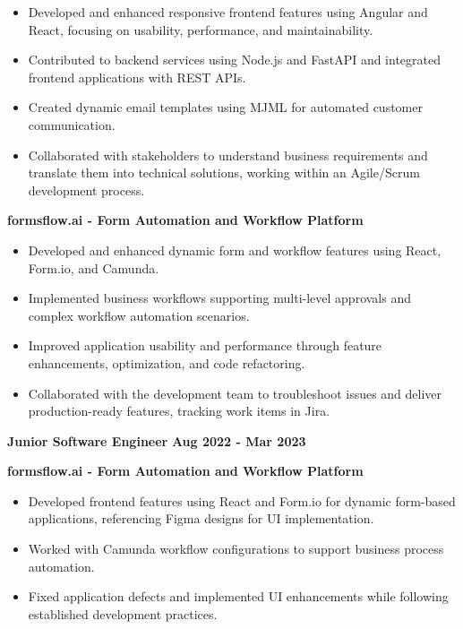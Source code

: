 \documentclass[10pt,a4paper]{article}
\begin{document}
\begin{itemize}
    \item Developed and enhanced responsive frontend features using Angular and React, focusing on usability, performance, and maintainability.
    
    \item Contributed to backend services using Node.js and FastAPI and integrated frontend applications with REST APIs.
    
    \item Created dynamic email templates using MJML for automated customer communication.
    
    \item Collaborated with stakeholders to understand business requirements and translate them into technical solutions, working within an Agile/Scrum development process.
\end{itemize}

\textbf{formsflow.ai - Form Automation and Workflow Platform}

\begin{itemize}
    \item Developed and enhanced dynamic form and workflow features using React, Form.io, and Camunda.
    
    \item Implemented business workflows supporting multi-level approvals and complex workflow automation scenarios.
    
    \item Improved application usability and performance through feature enhancements, optimization, and code refactoring.
    
    \item Collaborated with the development team to troubleshoot issues and deliver production-ready features, tracking work items in Jira.
\end{itemize}


\textbf{Junior Software Engineer} \hfill \textbf{Aug 2022 - Mar 2023}

\textbf{formsflow.ai - Form Automation and Workflow Platform}

\begin{itemize}
    \item Developed frontend features using React and Form.io for dynamic form-based applications, referencing Figma designs for UI implementation.
    
    \item Worked with Camunda workflow configurations to support business process automation.
    
    \item Fixed application defects and implemented UI enhancements while following established development practices.
\end{itemize}
\end{document}
